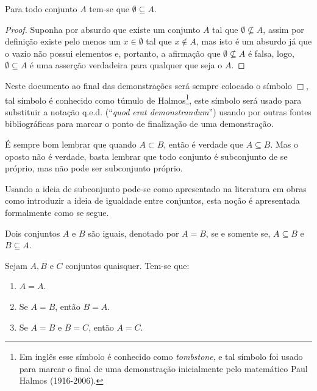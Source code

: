 \begin{teorema}\label{teo:ConjuntoVazioSubDeTodos}
	Para todo conjunto $A$ tem-se que $\emptyset \subseteq A$.
\end{teorema}

\begin{proof}
	Suponha por absurdo que existe um conjunto $A$ tal que $\emptyset \not\subseteq A$, assim por definição  existe pelo menos um $x \in \emptyset$ tal que $x \notin A$, mas isto é um absurdo já que o vazio não possui elementos e, portanto, a afirmação que $\emptyset \not\subseteq A$ é falsa, logo, $\emptyset \subseteq A$ é uma asserção verdadeira para qualquer que seja o $A$.
\end{proof}

\begin{nota}
  Neste documento ao final das demonstrações será sempre colocado o símbolo $\Box$, tal símbolo é conhecido como túmulo de Halmos\footnote{Em inglês esse símbolo é conhecido como \textit{tombstone}, e tal símbolo foi usado para marcar o final de uma demonstração inicialmente pelo matemático Paul Halmos (1916-2006).}, este símbolo será usado para substituir a notação q.e.d. (``\textit{quod erat demonstrandum}'') usando por outras fontes bibliográficas para marcar o ponto de finalização de uma demonstração. 
\end{nota}

\begin{dica}\label{tips:SobreInclusaoConjunto}
 É sempre bom lembrar que quando $A \subset B$, então é verdade que $A \subseteq B$. Mas o oposto não é verdade, basta lembrar que todo conjunto é subconjunto de se próprio, mas não pode ser subconjunto próprio.
\end{dica}

Usando a ideia de subconjunto pode-se como apresentado na literatura em obras como \cite{abe1991-TC, halmos2001, lipschutz1978-TC} introduzir a ideia de igualdade entre conjuntos, esta noção é apresentada formalmente como se segue.

\begin{definicao}\label{def:IgualdadeConjuntos}
  \cite{abe1991-TC} Dois conjuntos $A$ e $B$ são iguais, denotado por $A = B$, se e somente se, $A \subseteq B$ e $B \subseteq A$.
\end{definicao}

\begin{teorema}
	Sejam $A, B$ e $C$ conjuntos quaisquer. Tem-se que:
	\begin{enumerate}
		\item $A = A$.
		\item Se $A = B$, então $B = A$.
		\item Se $A = B$ e $B = C$, então $A = C$.
	\end{enumerate}
\end{teorema}

